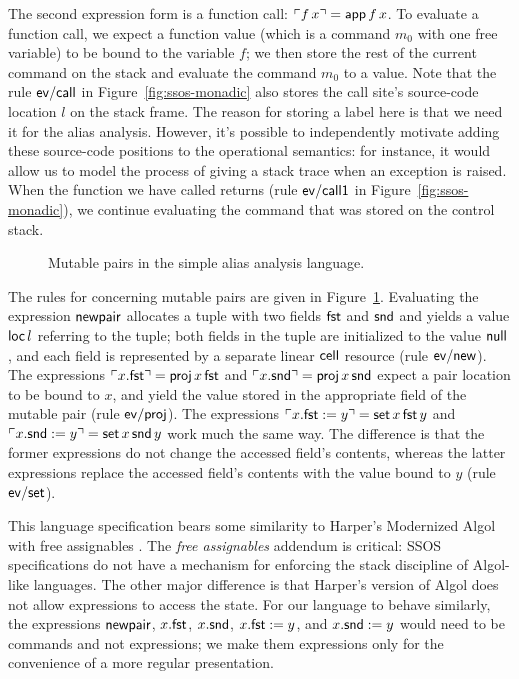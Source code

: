 The second expression form is a function call: ${\ulcorner{f\,x}\urcorner} = {\sf
  app}\,f\,x$. To evaluate a function call, we expect a function value
(which is a command $m_0$ with one free variable) to be bound to the
variable $f$; we then store the rest of the current command on the
stack and evaluate the command $m_0$ to a value. Note that the rule
${\sf ev/call}$ in Figure~\ref{fig:ssos-monadic} also stores the call
site's source-code location $l$ on the stack frame. The reason for
storing a label here is that we need it for the alias
analysis. However, it's possible to independently motivate adding
these source-code positions to the operational semantics: for instance, it
would allow us to model the process of giving a stack trace when an
exception is raised. When the function we have called returns (rule
${\sf ev/call1}$ in Figure~\ref{fig:ssos-monadic}), we continue
evaluating the command that was stored on the control stack.

\begin{figure}
\caption{Mutable pairs in the simple alias analysis language.}
\label{fig:ssos-monadic2}
\end{figure}

The rules for concerning mutable pairs are given in
Figure~\ref{fig:ssos-monadic2}. Evaluating the expression ${\sf
  newpair}$ allocates a tuple with two fields ${\sf fst}$ and ${\sf
  snd}$ and yields a value ${\sf loc}\,l$ referring to the tuple; both
fields in the tuple are initialized to the value ${\sf null}$, and
each field is represented by a separate linear ${\sf cell}$ resource
(rule ${\sf ev/new}$). The expressions ${\ulcorner{x.{\sf fst}}\urcorner} = {\sf
  proj}\,x\,{\sf fst}$ and ${\ulcorner{x.{\sf snd}}\urcorner} = {\sf proj}\,x\,{\sf
  snd}$ expect a pair location to be bound to $x$, and yield the value
stored in the appropriate field of the mutable pair (rule ${\sf
  ev/proj}$). The expressions ${\ulcorner{x.{\sf fst} := y}\urcorner} = {\sf
  set}\,x\,{\sf fst}\,y$ and ${\ulcorner{x.{\sf snd} := y}\urcorner} = {\sf
  set}\,x\,{\sf snd}\,y$ work much the same way. The difference is
that the former expressions do not change the accessed field's
contents, whereas the latter expressions replace the accessed field's
contents with the value bound to $y$ (rule ${\sf ev/set}$).

This language specification bears some similarity to Harper's
Modernized Algol with free assignables \cite[Chapter
36]{harper12practical}. The {\it free assignables} addendum is
critical: SSOS specifications do not have a mechanism for enforcing
the stack discipline of Algol-like languages. The other major
difference is that Harper's version of Algol does not allow
expressions to access the state.  For our language to behave
similarly, the expressions ${\sf newpair}$, $x.{\sf fst}$, $x.{\sf
  snd}$, $x.{\sf fst} := y$, and $x.{\sf snd} := y$ would need to be
commands and not expressions; we make them expressions only for the
convenience of a more regular presentation.

